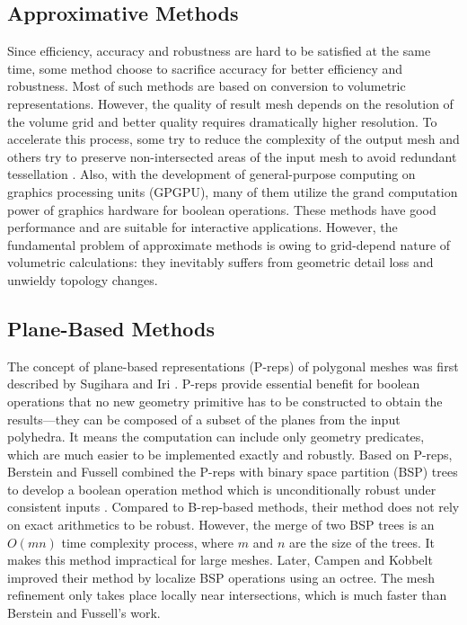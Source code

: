 \documentclass[10pt,journal,compsoc]{IEEEtran}
\begin{document}
\subsection{Approximative Methods}

Since efficiency, accuracy and robustness are hard to be satisfied at the same time, some method choose to sacrifice accuracy for better efficiency and robustness. Most of such methods are based on conversion to volumetric representations. However, the quality of result mesh depends on the resolution of the volume grid and better quality requires dramatically higher resolution. To accelerate this process, some try to reduce the complexity of the output mesh \cite{varadhan2004topology} and others try to preserve non-intersected areas of the input mesh to avoid redundant tessellation \cite{pavic2010hybrid,wang2011approximate,zhao2011parallel,hable2005blister,ogayar2006gpu}. Also, with the development of general-purpose computing on graphics processing units (GPGPU), many of them utilize the grand computation power of graphics hardware for boolean operations. These methods have good performance and are suitable for interactive applications. However, the fundamental problem of approximate methods is owing to grid-depend nature of volumetric calculations: they inevitably suffers from geometric detail loss and unwieldy topology changes.


\subsection{Plane-Based Methods}
\label{sec:pbrelated}

The concept of plane-based representations (P-reps) of polygonal meshes was first described by Sugihara and Iri \cite{sugihara1990solid}. P-reps provide essential benefit for boolean operations that no new geometry primitive has to be constructed to obtain the results---they can be composed of a subset of the planes from the input polyhedra. It means the computation can include only geometry predicates, which are much easier to be implemented exactly and robustly. Based on P-reps, Berstein and Fussell \cite{bernstein2009fast} combined the P-reps with binary space partition (BSP) trees \cite{thibault1987set,naylor1990merging} to develop a boolean operation method which is unconditionally robust under consistent inputs . Compared to B-rep-based methods, their method does not rely on exact arithmetics to be robust. However, the merge of two BSP trees is an $O(mn)$ time complexity process, where $m$ and $n$ are the size of the trees. It makes this method impractical for large meshes. Later, Campen and Kobbelt \cite{campen2010exact} improved their method by localize BSP operations using an octree. The mesh refinement only takes place locally near intersections, which is much faster than Berstein and Fussell's work.
\end{document}
